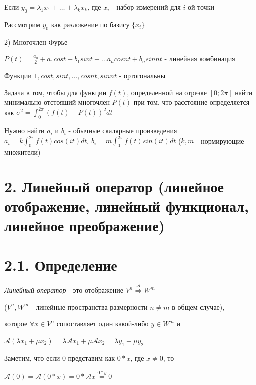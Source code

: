 \documentclass[12pt]{article}
\begin{document}
    Если $\displaystyle y_0 = \lambda_1 x_1 + \dots + \lambda_k x_k$, где $\displaystyle x_i$ - набор измерений для $i$-ой точки

    Рассмотрим $\displaystyle y_0$ как разложение по базису $\displaystyle \{x_i\}$

    \vspace{5mm}

    2) Многочлен Фурье

    $\displaystyle P(t) = \frac{a_0}{2} + a_1 cos t + b_1 sin t + \dots a_n cos nt + b_n sin nt$ - линейная комбинация

    Функции ${1, cos t, sin t, \dots, cos nt, sin nt}$ - ортогональны

    Задача в том, чтобы для функции $f(t)$, определенной на отрезке $[0;2\pi]$ найти минимально отстоящий многочлен $P(t)$ при том,
    что расстояние определяется как $\displaystyle \sigma^2 = \int_0^{2\pi} (f(t) - P(t))^2 dt$

    Нужно найти $\displaystyle a_i$ и $\displaystyle b_i$ - обычные скалярные произведения $\displaystyle a_i = k \int_0^{2\pi} f(t) cos(it) dt$, $\displaystyle b_i = m \int_0^{2\pi} f(t) sin(it) dt$ ($k, m$ - нормирующие множители)

    \clearpage

    \section[p2]{2. Линейный оператор (линейное отображение, линейный функционал, линейное преображение)}

    \section[p2\_1]{2.1. Определение}

    \textit{Линейный оператор} - это отображение $\displaystyle V^n \stackrel{\mathcal{A}}{\Longrightarrow} W^m$

    ($\displaystyle V^n, W^m$ - линейные пространства размерности $n \neq m$ в общем случае),

    которое $\displaystyle \forall x \in V^n$ сопоставляет один какой-либо $\displaystyle y \in W^m$ и

    $\displaystyle \mathcal{A} (\lambda x_1 + \mu x_2) = \lambda \mathcal{A} x_1 + \mu \mathcal{A} x_2 = \lambda y_1 + \mu y_2$

    \Nota Заметим, что если 0 представим как $0 * x$, где $x \neq 0$, то

    $\mathcal{A}(0) = \mathcal{A}(0 * x) = 0 * \mathcal{A}x \stackrel{0 * y}{=} 0$
\end{document}
